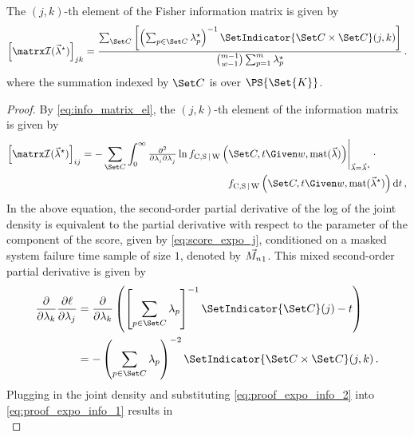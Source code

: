 \documentclass[../main.tex]{subfiles}
\begin{document}
The $(j,k)$-th element of the Fisher information matrix is given by
\begin{equation}
\label{eq:expo_info}
    \left [ \infomatrx(\tparam{\vec\lambda}) \right ]_{j k} =
        \frac
        {
            \sum_{\cand}
            \left [
                \left ( \sum_{p \in \cand} \tparam{\lambda}_p \right )^{-1}
                \SetIndicator{\cand \times \cand}(j,k)
            \right ]
        }
        {
            \binom{m-1}{w-1} \sum_{p=1}^{m} \tparam{\lambda}_p
        }\,.
\end{equation}
where the summation indexed by $\cand$ is over $\PS{\Set{K}}$.
\begin{proof}
By \cref{eq:info_matrix_el}, the $(j,k)$-th element of the information matrix is given by
\begin{equation}
\label{eq:proof_expo_info_1}
\begin{split}
    \left [ \infomatrx(\tparam{\vec\lambda}) \right ]_{i j}
    = - \sum_{\cand} \int_{0}^{\infty} &
        \eval
        {
            \md{}{2}{\lambda_i}{}{\lambda_j}{}
            \ln \jointpdf \left(\cand, t \Given w, \vectomat{\vec\lambda} \right)
        }_{\vec\lambda=\tparam{\vec\lambda}} 
        \cdot\\
        & \qquad \qquad \qquad \qquad \jointpdf \left(\cand, t \Given w, \vectomat{\tparam{\vec\lambda}} \right) \dif t\,,
\end{split}
\end{equation}
In the above equation, the second-order partial derivative of the log of the joint density is equivalent to the partial derivative with respect to the \kth parameter of the \jth component of the score, given by \cref{eq:score_expo_j}, conditioned on a masked system failure time sample of size $1$, denoted by $\vec{M_n}_1$. This mixed second-order partial derivative is given by
\begin{align}
    \frac{\partial{}}{\partial \lambda_k} \frac{\partial \ell}{\partial \lambda_j}
        &= \frac{\partial{}}{\partial \lambda_k} \left (
            \left [ \sum_{p \in \cand} \lambda_p \right ]^{-1}
            \SetIndicator{\cand}(j) - t \right )\\
    \label{eq:proof_expo_info_2}
        &= -\left ( \sum_{p \in \cand} \lambda_p \right )^{-2} \SetIndicator{\cand \times \cand}(j,k)\,.
\end{align}
Plugging in the joint density and substituting \cref{eq:proof_expo_info_2} into \cref{eq:proof_expo_info_1} results in
\begin{equation}

\end{equation}
\end{proof}
\end{document}
